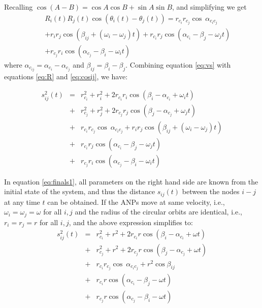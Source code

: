 \documentclass[10pt]{IEEEtran}
\begin{document}
\noindent
Recalling $\cos (A-B) = \cos A \cos B + \sin A \sin B$, and simplifying we get
\begin{eqnarray}
&&R_{i}(t)R_{j}(t)\cos (\theta_{i}(t)-\theta_{j}(t)) = r_{c_i} r_{c_j} \cos~\alpha_{c_{i}c_{j}}\nonumber \\
&& + r_{i} r_{j} \cos(\beta_{ij}+(\omega_{i}-\omega_{j})t)+r_{c_i}r_{j} \cos(\alpha_{c_{i}} - \beta_{j} - \omega_{j}t) \nonumber \\
&& + r_{c_j}r_{i} \cos(\alpha_{c_{j}} - \beta_{i} - \omega_{i}t)
\label{eq:cosij}
\end{eqnarray}
where $\alpha_{c_{ij}}=\alpha_{c_{i}}-\alpha_{c_{j}}$ and $\beta_{ij} = \beta_{i} - \beta_{j}$. Combining equation \ref{eq:vs} with equations \ref{eq:R} and \ref{eq:cosij}, we have:

\begin{eqnarray}
s_{ij}^{2}(t) &= & r_{c_{i}}^{2} + r_{i}^{2} + 2r_{c_{i}}r_{i}\cos(\beta_{i} - \alpha_{c_{i}}+ \omega_{i}t) \nonumber\\
& + & r_{c_{j}}^{2} + r_{j}^{2} + 2r_{c_{j}}r_{j}\cos(\beta_{j} - \alpha_{c_{j}} + \omega_{j}t) \nonumber \\
& + & r_{c_i} r_{c_j} \cos~\alpha_{c_{i}c_{j}} + r_{i} r_{j} \cos(\beta_{ij} +(\omega_{i}-\omega_{j})t) \nonumber \\
& + & r_{c_i}r_{j} \cos(\alpha_{c_{i}} - \beta_{j} - \omega_{j}t) \nonumber \\
& + & r_{c_j} r_{i} \cos(\alpha_{c_{j}} - \beta_{i} - \omega_{i}t)
\label{eq:finals1}
\end{eqnarray}

In equation \ref{eq:finals1}, all parameters on the right hand side are known from the initial state of the system, and thus the distance $s_{ij}(t) $ between the nodes  $i-j$ at any time $t$ can be obtained. If the ANPs move at same velocity, i.e., $\omega_{i}=\omega_{j} = \omega$ for all $i,j$ and the radius of the circular orbits are identical, i.e., $r_{i} = r_{j} = r$ for all $i,j$, and the above expression simplifies to:
\begin{eqnarray}
s_{ij}^{2}(t) &= & r_{c_{i}}^{2} + r^{2} + 2r_{c_{i}}r\cos(\beta_{i} - \alpha_{c_{i}}+ \omega t) \nonumber\\
& + & r_{c_{j}}^{2} + r^{2} + 2r_{c_{j}}r\cos(\beta_{j} - \alpha_{c_{j}} + \omega t) \nonumber \\
& + & r_{c_i} r_{c_j} \cos~\alpha_{c_{i}c_{j}} + r^{2} \cos\beta_{ij} \nonumber \\
& + & r_{c_i}r \cos(\alpha_{c_{i}} - \beta_{j} - \omega t) \nonumber \\
& + & r_{c_j}r \cos(\alpha_{c_{j}} - \beta_{i} - \omega t)
\label{eq:finals2}
\end{eqnarray}
\end{document}
